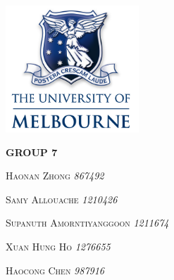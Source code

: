 \pagecolor{White}\afterpage{\nopagecolor}


\includegraphics[width=5cm]{images/uom.png}
\vspace*{1cm}

\fontsize{50}{55}

\fontsize{50}{55}

\vspace{100mm}

\Large{\textbf{GROUP 7}}

\textsc{Haonan Zhong \textit{867492}}

\textsc{Samy Allouache \textit{1210426}}

\textsc{Supanuth Amorntiyanggoon \textit{1211674}}

\textsc{Xuan Hung Ho \textit{1276655}}

\textsc{Haocong Chen \textit{987916}}

\normalsize

\thispagestyle{empty}



\restoregeometry   
\newpage